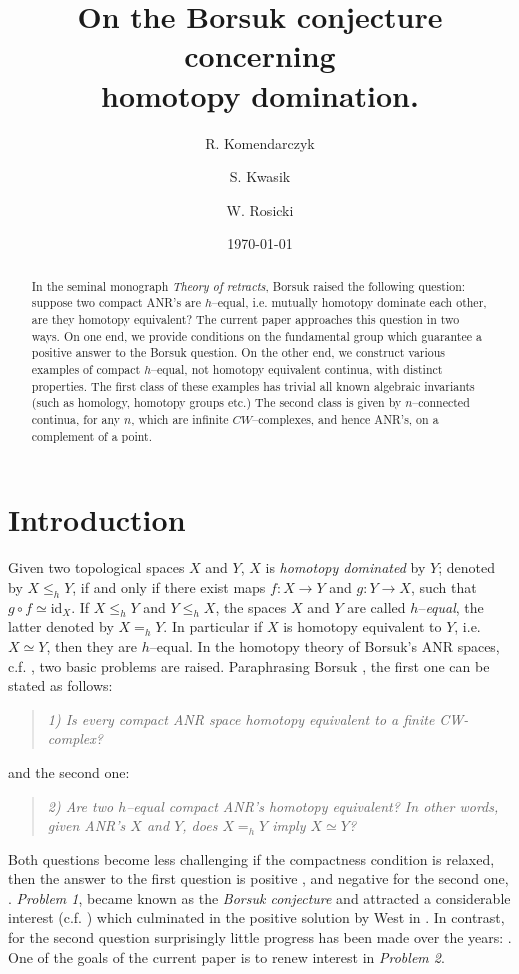 \documentclass[reqno,12pt]{amsart}
\title[Borsuk conjecture and homotopy domination]{On the Borsuk conjecture concerning\\
homotopy domination.}
\date{\today}
\author{R. Komendarczyk}\thanks{The first author acknowledges the support of  DARPA YFA N66001-11-1-4132 and NSF DMS 1043009.}
\author{S. Kwasik}\thanks{The second author acknowledges the support of the Simons Foundation Grant No. 281810}
\author{W. Rosicki}
\theoremstyle{ourremark}
\numberwithin{equation}{section}
\numberwithin{theorem}{section}
\begin{document}
\setcounter{section}{0}

\begin{abstract}
 In the seminal monograph {\em Theory of retracts}, Borsuk raised the following question: suppose  two compact ANR's are $h$--equal, i.e. mutually homotopy dominate each other, are they homotopy equivalent? The current paper approaches this question in two ways. On one end, we provide conditions on the fundamental group which guarantee a positive answer to the Borsuk question.  On the other end, we construct various examples of compact $h$--equal, not homotopy equivalent continua, with distinct properties. The first class of these examples has trivial all known algebraic invariants (such as homology, homotopy groups etc.) The second class is given by  $n$--connected  continua, for any $n$, which are infinite $CW$--complexes, and hence ANR's, on a complement of a point.  
\end{abstract}

\maketitle

\section{Introduction}\label{sec:intro}
Given two topological spaces $X$ and $Y$, $X$ is {\em homotopy dominated} by $Y$; denoted by $X\leq_h Y$, if and only if there exist maps $f:X\longrightarrow Y$ and $g:Y\longrightarrow X$,
such that $g\circ f\simeq \text{id}_X$. If $X\leq_h Y$ and $Y\leq_h X$, the spaces $X$ and $Y$ are called $h$--{\em equal}, the latter denoted by $X=_h Y$. In particular if $X$ is homotopy equivalent to $Y$, i.e. $X\simeq Y$, then they are $h$--equal. In the homotopy theory of Borsuk's ANR spaces, c.f. \cite{Borsuk67}, two basic problems are raised. Paraphrasing  Borsuk \cite{Borsuk67}, the first one can be stated as follows:
\begin{quote}
{\em  1) Is every compact ANR space homotopy equivalent to a finite CW-complex?}
\end{quote}
and the second one:
\begin{quote}
{\em 2) Are two $h$--equal compact ANR's homotopy equivalent? In other words, given ANR's $X$ and $Y$, does $X=_h Y$ imply $X\simeq Y$?}
\end{quote}
{\noindent} Both questions become less challenging if the compactness condition is relaxed, then the answer to the first question is positive \cite{Milnor59}, and negative for the second one, \cite{Stewart58}.  {\em Problem 1}, became known as the {\em Borsuk conjecture} and attracted a considerable interest (c.f. \cite{Milnor59, Kirby-Siebenmann77, Quinn79, Bryant-Ferry-Mio-Weinberger96}) which culminated in the positive solution by West in \cite{West77}. In contrast, for the second question surprisingly little progress has been made over the years: \cite{Kwasik84, Kolodziejczyk05, Stewart58}. One of the goals of the current paper is to renew interest in  {\em Problem 2}. 
\end{document}
